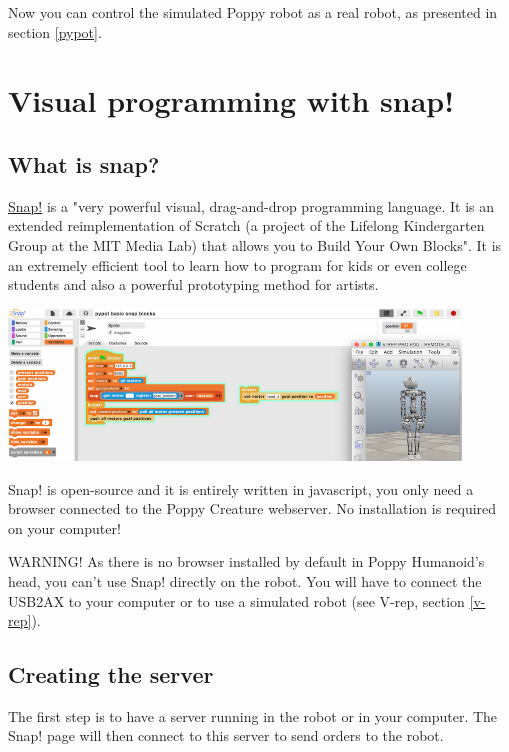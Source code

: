\documentclass{article}
\begin{document}
Now you can control the simulated Poppy robot as a real robot, as presented in section \ref{pypot}.



\section{Visual programming with snap!}
\label{programming-with-snap}

\subsection{What is snap?}

\href{http://snap.berkeley.edu/}{Snap!} is a "very powerful visual, drag-and-drop programming language. It is an extended reimplementation of Scratch (a project of the Lifelong Kindergarten Group at the MIT Media Lab) that allows you to Build Your Own Blocks". It is an extremely efficient tool to learn how to program for kids or even college students and also a powerful prototyping method for artists.

 \begin{center}
  \includegraphics[width=0.9\textwidth]{img/snap-header}
 \end{center}

Snap! is open-source and it is entirely written in javascript, you only need a browser connected to the Poppy Creature webserver. No installation is required on your computer!

WARNING! As there is no browser installed by default in Poppy Humanoid's head, you can't use Snap! directly on the robot. You will have to connect the USB2AX to your computer or to use a simulated robot (see V-rep, section \ref{v-rep}).

\subsection{Creating the server}

The first step is to have a server running in the robot or in your computer. The Snap! page will then connect to this server to send orders to the robot.
\end{document}
